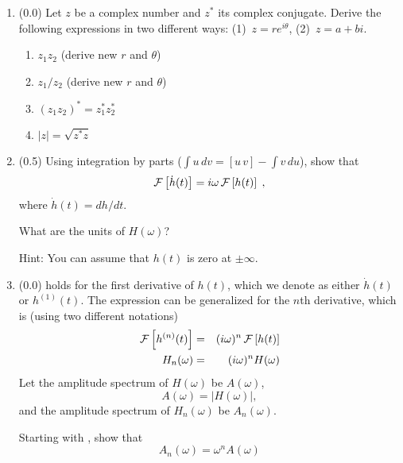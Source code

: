 \documentclass[11pt,titlepage,fleqn]{article}
\newcommand{\fft}{h}
\newcommand{\ffw}{H}
\begin{document}
\begin{enumerate}

\item (0.0) Let $z$ be a complex number and $z^*$ its complex conjugate. Derive the following expressions in two different ways: (1)~$z = r e^{i\theta}$, (2)~$z = a+bi$.
%
\begin{enumerate}
\item $z_1 z_2$ (derive new $r$ and $\theta$)
\item $z_1 / z_2$ (derive new $r$ and $\theta$)
\item $(z_1 z_2)^* = z_1^* z_2^*$
\item $|z| = \sqrt{z^* z}$
\end{enumerate}


\item (0.5) Using integration by parts ($\int u\,dv = [u\,v] - \int v\,du$), show that 
%
\begin{eqnarray}
\cF \left[ \dot{\fft}(t) \right] = i\omega \, \cF \left[ \fft(t) \right]
\label{fftder1}
\;,
\end{eqnarray}
%
where $\dot{\fft}(t) = d\fft/dt$.

What are the units of $\ffw(\omega)$?

Hint: You can assume that $h(t)$ is zero at $\pm\infty$.


\item (0.0)  holds for the first derivative of $\fft(t)$, which we denote as either $\dot{\fft}(t)$ or $\fft^{(1)}(t)$. The expression can be generalized for the $n$th derivative, which is (using two different notations)
%
\begin{eqnarray}
\cF \left[ \fft^{(n)}(t) \right] &=& (i\omega)^n \, \cF \left[ \fft(t) \right]
\\
\ffw_n(\omega) &=& (i\omega)^n \ffw(\omega)
\label{fftnder}
\end{eqnarray}
%
Let the amplitude spectrum of $\ffw(\omega)$ be $A(\omega)$,
%
\begin{equation}
A(\omega) = |\ffw(\omega)|,
\end{equation}
%
and the amplitude spectrum of $\ffw_n(\omega)$ be $A_n(\omega)$.

Starting with , show that
%
\begin{equation}
A_n(\omega) = \omega^n A(\omega)
\end{equation}



\end{enumerate}
\end{document}
